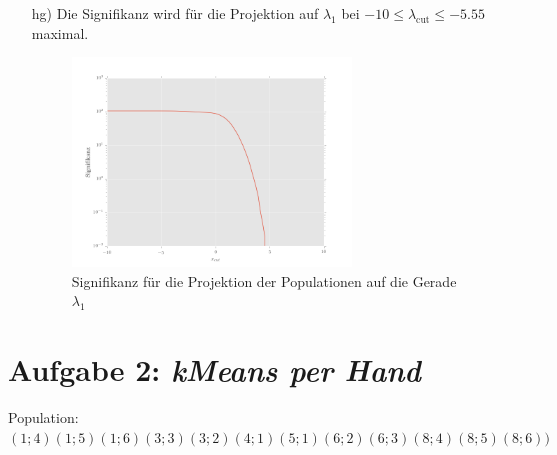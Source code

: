 \begin{itemize}
\item[hg)] Die Signifikanz wird für die Projektion auf $\lambda_1$ bei $-10 \leq \lambda_{\text{cut}} \leq -5.55$ maximal.
\begin{figure}[H]
	\centering
	\includegraphics[width=0.7\textwidth]{signifikanz_h.png}
	\caption{Signifikanz für die Projektion der Populationen auf die Gerade $\lambda_1$}
\end{figure}



\end{itemize}
\section*{Aufgabe 2: \emph{kMeans per Hand}}

Population: $(1;4) (1;5) (1;6) (3;3) (3;2) (4;1) (5;1) (6;2) (6;3) (8;4) (8;5) (8;6))$

